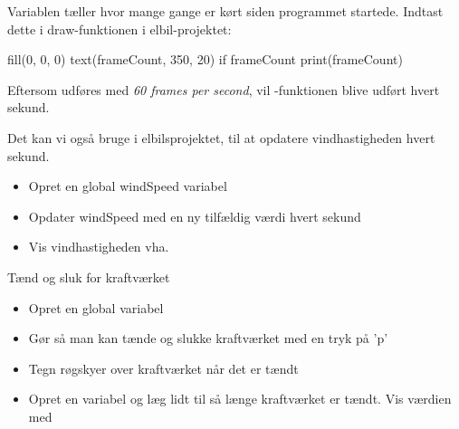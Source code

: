 \documentclass{ucph-handout}
\begin{document}
\begin{exercisebox}[adjusted title= Skftiende vindhastighed]
Variablen  tæller hvor mange gange  er
kørt siden programmet startede. Indtast dette i draw-funktionen i
elbil-projektet:
\begin{python}
fill(0, 0, 0)
text(frameCount, 350, 20)
if frameCount %
    print(frameCount)
\end{python}



\noindent
Eftersom  udføres med \textit{60 frames per second}, vil
-funktionen blive udført hvert sekund.

\vspace{2mm}
\noindent
Det kan vi også bruge i elbilsprojektet, til at opdatere
vindhastigheden hvert sekund.
  \begin{itemize}
  \item Opret en global windSpeed variabel
  \item Opdater windSpeed med en ny tilfældig værdi hvert sekund
  \item Vis vindhastigheden vha. 
  \end{itemize}
 \item
   Tænd og sluk for kraftværket
   \begin{itemize}
   \item Opret en global variabel 
   \item Gør så man kan tænde og slukke kraftværket med en tryk på 'p'
   \item Tegn røgskyer over kraftværket når det er tændt
   \item Opret en variabel  og læg lidt til så længe
     kraftværket er tændt. Vis værdien med 
   \end{itemize}
\end{exercisebox}
\end{document}
